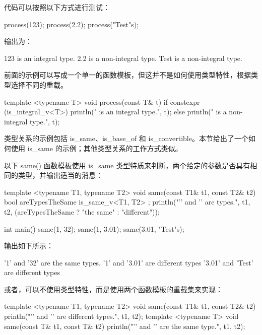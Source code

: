 代码可以按照以下方式进行测试：

\begin{cpp}
process(123);
process(2.2);
process("Test"s);
\end{cpp}

输出为：

\begin{shell}
123 is an integral type.
2.2 is a non-integral type.
Test is a non-integral type.
\end{shell}

前面的示例可以写成一个单一的函数模板，但这并不是如何使用类型特性，根据类型选择不同的重载。

\begin{cpp}
template <typename T>
void process(const T& t)
{
    if constexpr (is_integral_v<T>) {
        println("{} is an integral type.", t);
    } else {
        println("{} is a non-integral type.", t);
    }
}
\end{cpp}



类型关系的示例包括 is\_same、is\_base\_of 和 is\_convertible。本节给出了一个如何使用 is\_same 的示例；其他类型关系的工作方式类似。

以下 same() 函数模板使用 is\_same 类型特质来判断，两个给定的参数是否具有相同的类型，并输出适当的消息：

\begin{cpp}
template <typename T1, typename T2>
void same(const T1& t1, const T2& t2)
{
    bool areTypesTheSame { is_same_v<T1, T2> };
    println("'{}' and '{}' are {} types.", t1, t2,
    (areTypesTheSame ? "the same" : "different"));
}

int main()
{
    same(1, 32);
    same(1, 3.01);
    same(3.01, "Test"s);
}
\end{cpp}

输出如下所示：

\begin{shell}
'1' and '32' are the same types.
'1' and '3.01' are different types
'3.01' and 'Test' are different types
\end{shell}

或者，可以不使用类型特性，而是使用两个函数模板的重载集来实现：

\begin{cpp}
template <typename T1, typename T2>
void same(const T1& t1, const T2& t2)
{
    println("'{}' and '{}' are different types.", t1, t2);
}
template <typename T>
void same(const T& t1, const T& t2)
{
    println("'{}' and '{}' are the same type.", t1, t2);
}
\end{cpp}

